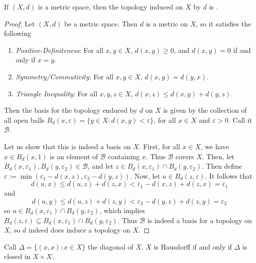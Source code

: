 \documentclass[12pt, a4paper, oneside, openright, titlepage]{book}
\begin{document}
\begin{xca}
    If $(X,d)$ is a metric space, then the topology induced on $X$ by $d$ is . 
\end{xca}
\begin{proof}
    Let $(X,d)$ be a metric space. Then $d$ is a metric on $X$, so it satisfies the following \begin{enumerate}
        \item \emph{Positive-Definiteness}: For all $x,y \in X$, $d(x,y) \geq 0$, and $d(x,y) = 0$ if and only if $x = y$.
        \item \emph{Symmetry/Commutivity}: For all $x,y \in X$, $d(x,y) = d(y,x)$.
        \item \emph{Triangle Inequality}: For all $x,y,z \in X$, $d(x,z) \leq d(x,y) + d(y,z)$.
    \end{enumerate}
    Then the basis for the topology enduced by $d$ on $X$ is given by the collection of all open balls $B_d(x,\varepsilon) = \{y \in X: d(x,y) < \varepsilon\}$, for all $x \in X$ and $\varepsilon > 0$. Call it $\mathcal{B}$.

    Let us show that this is indeed a basis on $X$. First, for all $x \in X$, we have $x \in B_d(x,1)$ is an element of $\mathcal{B}$ containing $x$. Thus $\mathcal{B}$ covers $X$. Then, let $B_d(x,\varepsilon_1),B_d(y,\varepsilon_2) \in \mathcal{B}$, and let $z \in B_d(x,\varepsilon_1)\cap B_d(y,\varepsilon_2)$. Then define $\varepsilon := \min(\varepsilon_1 - d(x,z), \varepsilon_2 -d(y,z))$. Now, let $u \in B_d(z,\varepsilon)$. It follows that \begin{equation*}
        d(u,x) \leq d(u,z) + d(z,x) < \varepsilon_1 - d(x,z) + d(z,x) = \varepsilon_1
    \end{equation*}
    and \begin{equation*}
        d(u,y) \leq d(u,z) + d(z,y) < \varepsilon_2 - d(y,z) + d(z,y) = \varepsilon_2
    \end{equation*}
    so $u \in B_d(x,\varepsilon_1)\cap B_d(y,\varepsilon_2)$, which implies $B_d(z,\varepsilon) \subseteq B_d(x,\varepsilon_1)\cap B_d(y,\varepsilon_2)$. Thus $\mathcal{B}$ is indeed a basis for a topology on $X$, so $d$ indeed does induce a topology on $X$.
\end{proof}

\begin{xca}
    Call $\Delta = \{(x,x): x \in X\}$ the diagonal of $X$. $X$ is Hausdorff if and only if $\Delta$ is closed in $X \times X$.
\end{xca}
\end{document}
